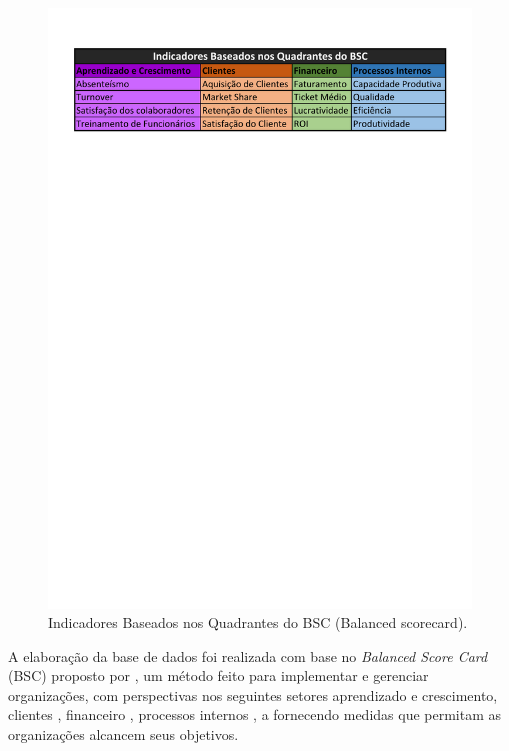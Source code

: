 \documentclass[
	12pt,				%
	openright,			%
	oneside,			%
	a4paper,			%
	english,			%
	brazil				%
	]{abntex2}
\begin{document}
\begin{figure}[h]
	\caption{\label{tabela_indicadores} Indicadores Baseados nos Quadrantes do BSC (Balanced scorecard).
}
	\begin{center}
	    \includegraphics[width=\textwidth,scale=1,trim={0cm 230mm, 0mm 20mm},clip]
	    {figures/Indicadores - BSC.pdf}
	\end{center}
\end{figure}


A elaboração da base de dados foi realizada com base no \textit{Balanced Score Card} (BSC) proposto por \cite{kaplan2000balanced}, um método feito para implementar e gerenciar organizações, com perspectivas nos seguintes setores aprendizado e crescimento, clientes , financeiro ,  processos internos , a  fornecendo medidas que permitam as organizações alcancem seus objetivos.
\end{document}
